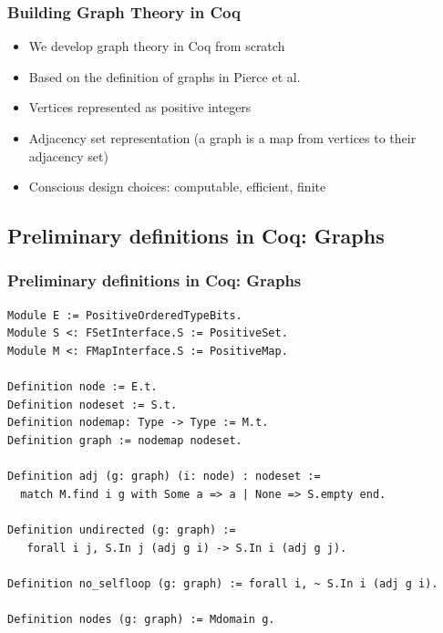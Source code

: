 \documentclass{beamer}
\begin{document}
\begin{frame}
\frametitle{Building Graph Theory in Coq}
\begin{itemize}
\item We develop graph theory in Coq from scratch
\item Based on the definition of graphs in Pierce et al.
\item Vertices represented as positive integers
\item Adjacency set representation (a graph is a map from vertices to
  their adjacency set)
\item Conscious design choices: computable, efficient, finite
\end{itemize}
\end{frame}

\subsection{Preliminary definitions in Coq: Graphs}
\begin{frame}[fragile]
\frametitle{Preliminary definitions in Coq: Graphs}
\begin{verbatim}
Module E := PositiveOrderedTypeBits.
Module S <: FSetInterface.S := PositiveSet.
Module M <: FMapInterface.S := PositiveMap.

Definition node := E.t.
Definition nodeset := S.t.
Definition nodemap: Type -> Type := M.t.
Definition graph := nodemap nodeset.

Definition adj (g: graph) (i: node) : nodeset :=
  match M.find i g with Some a => a | None => S.empty end.

Definition undirected (g: graph) :=
   forall i j, S.In j (adj g i) -> S.In i (adj g j).

Definition no_selfloop (g: graph) := forall i, ~ S.In i (adj g i).

Definition nodes (g: graph) := Mdomain g.
\end{verbatim}
\end{frame}
\end{document}
